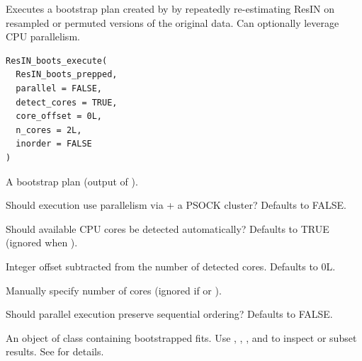 \documentclass[a4paper]{book}
\begin{document}
%
\begin{Description}
Executes a bootstrap plan created by  by repeatedly
re-estimating ResIN on resampled or permuted versions of the original data.
Can optionally leverage CPU parallelism.
\end{Description}
%
\begin{Usage}
\begin{verbatim}
ResIN_boots_execute(
  ResIN_boots_prepped,
  parallel = FALSE,
  detect_cores = TRUE,
  core_offset = 0L,
  n_cores = 2L,
  inorder = FALSE
)
\end{verbatim}
\end{Usage}
%
\begin{Arguments}
\begin{ldescription}
\item[\code{ResIN\_boots\_prepped}] A  bootstrap plan (output of ).

\item[\code{parallel}] Should execution use parallelism via  + a PSOCK cluster? Defaults to FALSE.

\item[\code{detect\_cores}] Should available CPU cores be detected automatically? Defaults to TRUE (ignored when ).

\item[\code{core\_offset}] Integer offset subtracted from the number of detected cores. Defaults to 0L.

\item[\code{n\_cores}] Manually specify number of cores (ignored if  or ).

\item[\code{inorder}] Should parallel execution preserve sequential ordering? Defaults to FALSE.
\end{ldescription}
\end{Arguments}
%
\begin{Value}
An object of class  containing  bootstrapped
 fits. Use , , , and \code{[}
to inspect or subset results. See  for details.
\end{Value}
\end{document}
